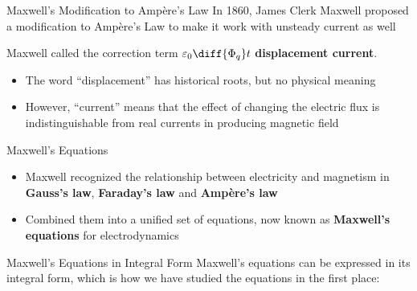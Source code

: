 \documentclass[12pt,aspectratio=169]{beamer}
\begin{document}
\begin{frame}{Maxwell's Modification to Amp\`{e}re's Law}
  In 1860, James Clerk Maxwell proposed a modification to Amp\`{e}re's Law to
  make it work with unsteady current as well



  Maxwell called the correction term $\displaystyle\varepsilon_0\diff{\Phi_q}t$
  \textbf{displacement current}.
  \begin{itemize}
  \item The word ``displacement'' has historical roots, but no physical meaning
  \item However, ``current'' means that the effect of changing the electric
    flux is indistinguishable from real currents in producing magnetic field
  \end{itemize}
\end{frame}



\begin{frame}{Maxwell's Equations}
  \begin{itemize}
  \item Maxwell recognized the relationship between electricity and
    magnetism in \textbf{Gauss's law}, \textbf{Faraday's law} and
    \textbf{Amp\`{e}re's law}
  \item Combined them into a unified set of equations, now known as
    \textbf{Maxwell's equations} for electrodynamics
  \end{itemize}
\end{frame}



\begin{frame}{Maxwell's Equations in Integral Form}
  Maxwell's equations can be expressed in its integral form, which is how we
  have studied the equations in the first place:

\end{frame}
\end{document}
